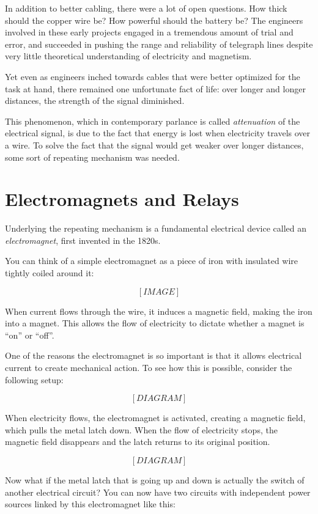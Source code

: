 \documentclass{book}
\begin{document}
In addition to better cabling, there were a lot of open questions. How thick should the copper wire be? How powerful should the battery be? The engineers involved in these early projects engaged in a tremendous amount of trial and error, and succeeded in pushing the range and reliability of telegraph lines despite very little theoretical understanding of electricity and magnetism.

Yet even as engineers inched towards cables that were better optimized for the task at hand, there remained one unfortunate fact of life: over longer and longer distances, the strength of the signal diminished.

This phenomenon, which in contemporary parlance is called \emph{attenuation} of the electrical signal, is due to the fact that energy is lost when electricity travels over a wire. To solve the fact that the signal would get weaker over longer distances, some sort of repeating mechanism was needed.

\section{Electromagnets and Relays}

Underlying the repeating mechanism is a fundamental electrical device called an \emph{electromagnet}, first invented in the 1820s.

You can think of a simple electromagnet as a piece of iron with insulated wire tightly coiled around it:

\[ [IMAGE] \]

When current flows through the wire, it induces a magnetic field, making the iron into a magnet. This allows the flow of electricity to dictate whether a magnet is ``on'' or ``off''.

One of the reasons the electromagnet is so important is that it allows electrical current to create mechanical action. To see how this is possible, consider the following setup:

\[ [DIAGRAM] \]

When electricity flows, the electromagnet is activated, creating a magnetic field, which pulls the metal latch down. When the flow of electricity stops, the magnetic field disappears and the latch returns to its original position.

\[ [DIAGRAM] \]

Now what if the metal latch that is going up and down is actually the switch of another electrical circuit? You can now have two circuits with independent power sources linked by this electromagnet like this:
\end{document}
